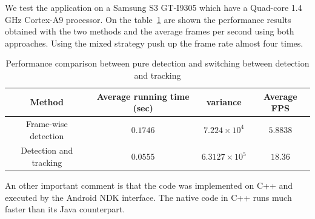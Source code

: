 We test the application on a Samsung S3 GT-I9305 which have a Quad-core 1.4 GHz
Cortex-A9 processor. On the table~\ref{tab:detectionvstracking} are shown the
performance results obtained with the two methods and the average frames per
second using both approaches. Using the mixed strategy push up the frame rate
almost four times.
 
\begin{table}
\begin{tabular}{|c|c|c|c|}
    \hline
    Method & Average running time (sec) & variance & Average FPS \\
    \hline
    Frame-wise detection & $0.1746$ & $7.224 \times 10^4$ & $5.8838$ \\
    \hline
    Detection and tracking  & $0.0555$ & $6.3127 \times 10^5$ & $18.36$ \\
    \hline
\end{tabular}
    \caption{Performance comparison between pure detection and switching between
    detection and tracking}
    \label{tab:detectionvstracking}
\end{table}

An other important comment is that the code was implemented on C++ and executed
by the Android NDK interface. The native code in C++ runs much faster than its
Java counterpart.



